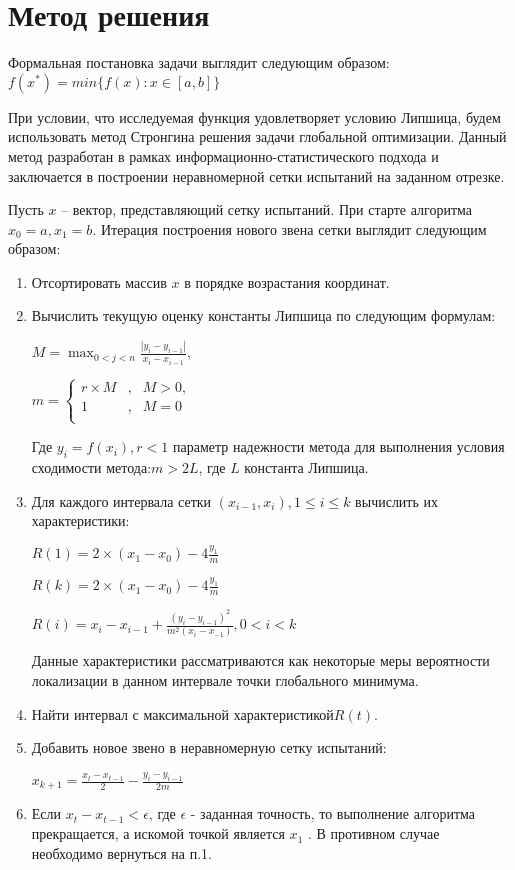 \documentclass{report}
\begin{document}
	\section*{Метод решения}
	Формальная постановка задачи выглядит следующим образом:
	$f({x}^{\ast}) = min \{f(x):x \in [a,b]\}$
	\par При условии, что исследуемая функция удовлетворяет условию Липшица, будем использовать метод Стронгина решения задачи глобальной оптимизации. Данный метод разработан в рамках информационно-статистического подхода и заключается в построении неравномерной сетки испытаний на заданном отрезке.
	\par Пусть $x$ – вектор, представляющий сетку испытаний. При старте алгоритма $x_0 = a, x_1 = b$. Итерация построения нового звена сетки выглядит следующим образом:
	\begin{enumerate}
		\item Отсортировать массив $x$ в порядке возрастания координат.
		\item Вычислить текущую оценку константы Липшица по следующим формулам: \par
		$M = \max_{0<j<n}\frac{|y_i - y_{i-1} |}{x_i - x_{i-1}},$\par
		$
		m =\left\{
		\begin{array}{rcl}
			r \times{} M&,&M > 0,\\
			1& , &M = 0\\
		\end{array}
		\right.
		$ \par
		Где $y_i = f(x_i), r < 1$ параметр надежности метода для выполнения условия сходимости метода:$m > 2L$, где $L$ константа Липшица.
		\item Для каждого интервала сетки $(x_{i-1},x_i), 1 \leq i \leq k$ вычислить их характеристики: \par
		$R(1) = 2\times{}(x_1 - x_0) - 4\frac{y_1}{m}$ \par
		$R(k) = 2\times{}(x_1 - x_0) - 4\frac{y_1}{m}$ \par
		$R(i) = x_i - x_{i-1} + \frac{({y_i - y_{i-1}})^2}{m^2(x_i-x_{-1})}, 0 < i < k$ \par
		Данные характеристики рассматриваются как некоторые меры вероятности локализации в данном интервале точки глобального минимума.
		\item Найти интервал с максимальной характеристикой$R(t)$.
		\item Добавить новое звено в неравномерную сетку испытаний:\par
		$x_{k+1} = \frac{x_t - x_{t -1}}{2} - \frac{y_i - y_{i - 1}}{2m}$
		\item Если $x_t - x_{t -1} < \epsilon$, где  $\epsilon$ - заданная точность, то выполнение алгоритма прекращается, а искомой точкой является $x_1$ . В противном случае необходимо вернуться на п.1.
	\end{enumerate}
	\newpage
	
\end{document}
